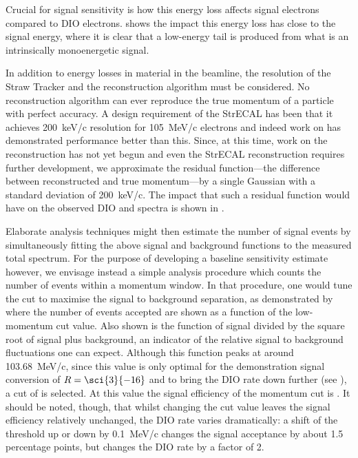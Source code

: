 Crucial for signal sensitivity is how this energy loss affects signal electrons compared to \ac{DIO} electrons.
 shows the impact this energy loss has close to the signal energy, where it is clear that a low-energy tail is produced from what is an intrinsically monoenergetic signal.

In addition to energy losses in material in the beamline, the resolution of the Straw Tracker and the reconstruction algorithm must be considered.
No reconstruction algorithm can ever reproduce the true momentum of a particle with perfect accuracy.
A design requirement of the StrECAL has been that it achieves 200~keV/c resolution for 105~MeV/c electrons and indeed work on \phaseI has demonstrated performance better than this.
Since, at this time, work on the \phaseII reconstruction has not yet begun and even the \phaseI StrECAL reconstruction requires further development, we approximate the residual function---the difference between reconstructed and true momentum---by a single Gaussian with a standard deviation of 200~keV/c.
The impact that such a residual function would have on the observed \ac{DIO} and \mueconv spectra is shown in .

\FigSensMomIntegral
Elaborate analysis techniques might then estimate the number of signal events by simultaneously fitting the above signal and background functions to the measured total spectrum.
For the purpose of developing a baseline sensitivity estimate however, we envisage instead a simple analysis procedure which counts the number of events within a momentum window.
In that procedure, one would tune the cut to maximise the signal to background separation, as demonstrated by  where the number of events accepted are shown as a function of the low-momentum cut value.
Also shown is the function of signal divided by the square root of signal plus background, an indicator of the relative signal to background fluctuations one can expect.
Although this function peaks at around 103.68~MeV/c, since this value is only optimal for the demonstration signal conversion of $R=\sci{3}{-16}$ and to bring the \ac{DIO} rate down further (see ), a cut of \VarMomThreshold is selected.
At this value the signal efficiency of the momentum cut is \VarAcceptanceMom.
It should be noted, though, that whilst changing the cut value leaves the signal efficiency relatively unchanged, the DIO rate varies dramatically: a shift of the threshold up or down by 0.1~MeV/c changes the signal acceptance by about 1.5 percentage points, but changes the DIO rate by a factor of 2.

